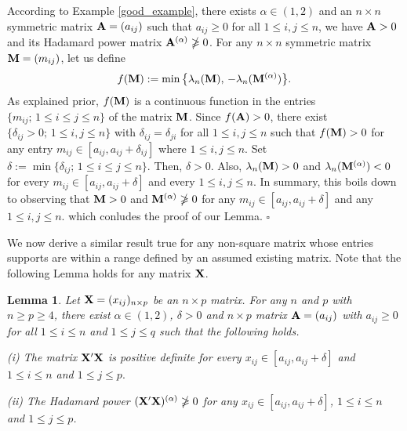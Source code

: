 \documentclass[conference,letterpaper]{IEEEtran}
\numberwithin{equation}{section}
\newcommand{\lbl}{\label}
\newcommand{\bd}{\bold}
\newcommand{\beaa}{\begin{eqnarray*}}
\newcommand{\eeaa}{\end{eqnarray*}}
\newtheorem{lemma}{{\sc Lemma}}[section]
\begin{document}
According to Example \ref{good_example}, there exists  $\alpha\in (1, 2)$ and an $n\times n$ symmetric matrix $\bd{A}=(a_{ij})$ such that $a_{ij}\geq 0$ for all $1\leq i, j \leq n$, we have $\bd{A}>0$ and its Hadamard power matrix $\bd{A}^{(\alpha)} \ngeqslant 0$. 
For any $n\times n$ symmetric matrix  $\bd{M}=(m_{ij})$, let us define
\beaa
f(\bd{M}):=\min\big\{\lambda_n(\bd{M}),\, -\lambda_n(\bd{M}^{(\alpha)})\big\}.
\eeaa
As explained prior, $f(\bd{M})$ is a continuous function in the entries $\{m_{ij};\, 1\leq i\leq j \leq n\}$ of the matrix $\bd{M}$. 
Since $f(\bd{A})>0$, there exist $\{\delta_{ij}>0;\, 1\leq i, j\leq n\}$ with $\delta_{ij}=\delta_{ji}$ for all $1\leq i, j\leq n$ such that $f(\bd{M})>0$ for any entry $m_{ij}\in [a_{ij}, a_{ij}+\delta_{ij}]$ where $1\leq i, j\leq n$.
Set $\delta := \min\{\delta_{ij};\, 1\leq i\leq j\leq n\}.$ Then, $\delta>0$. Also, $\lambda_n(\bd{M})>0$ and $\lambda_n(\bd{M}^{(\alpha)})<0$ for every $m_{ij}\in [a_{ij}, a_{ij}+\delta]$ and every $1\leq i, j\leq n.$ 
In summary, this boils down to observing that $\bd{M}>0$  and $\bd{M}^{(\alpha)} \ngeqslant 0$ for any $m_{ij}\in [a_{ij}, a_{ij}+\delta]$ and any $1\leq i, j\leq n.$ which conludes the proof of our Lemma.
\hfill$\square$
\medskip


We now derive a similar result true for any non-square matrix whose entries supports are within a range defined by an assumed existing matrix.
Note that the following Lemma holds for any matrix $\bd{X}$.
\begin{lemma}\lbl{lemma:lem2} Let $\bd{X}=(x_{ij})_{n\times p}$ be an $n\times p$ matrix. For any $n$ and $p$ with $n\geq p\geq 4$, there exist $\alpha\in (1,2)$, $\delta>0$ and $n\times p$ matrix  $\bd{A}=(a_{ij})$ with $a_{ij}\geq 0$ for all $1\leq i\leq n$ and $1\leq  j \leq q$ such that the following holds.

(i)  The matrix $\bd{X}'\bd{X}$ is positive definite for every $x_{ij}\in [a_{ij}, a_{ij}+\delta]$ and $1\leq i\leq n$ and $1\leq j \leq p.$

(ii) The Hadamard power $(\bd{X}'\bd{X})^{(\alpha)}\ngeqslant 0$  for any $x_{ij}\in [a_{ij}, a_{ij}+\delta]$, $1\leq i\leq n$ and $1\leq j \leq p$.
\end{lemma}
\medskip
\end{document}
